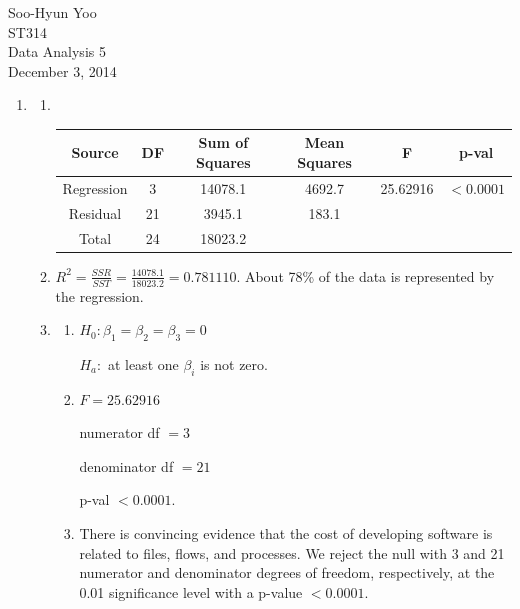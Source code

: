 \documentclass[12pt,letterpaper]{article}
\begin{document}
Soo-Hyun Yoo \\
ST314 \\
Data Analysis 5 \\
December 3, 2014

\begin{enumerate}
  \item
    \begin{enumerate}
      \item \hfill\\
        \begin{table}[!h]
          \centering
          \begin{tabular}{|c|c|c|c|c|c|} \hline
            Source & DF & Sum of Squares & Mean Squares & F & p-val \\ \hline\hline
            Regression & 3 & 14078.1 & 4692.7 & 25.62916 & $<0.0001$ \\ \hline
            Residual & 21 & 3945.1 & 183.1 & & \\ \hline
            Total & 24 & 18023.2 & & & \\ \hline
          \end{tabular}
        \end{table}
      \item $R^2 = \frac{SSR}{SST} = \frac{14078.1}{18023.2} = \boxed{0.781110}$. About 78\% of the data is represented by the regression.
      \item
        \begin{enumerate}
          \item $H_0: \beta_1 = \beta_2 = \beta_3 = 0$

            $H_a:$ at least one $\beta_i$ is not zero.
          \item $F = 25.62916$

            numerator df $= 3$

            denominator df $= 21$

            p-val $< 0.0001$.
          \item There is convincing evidence that the cost of developing
            software is related to files, flows, and processes. We reject the
            null with 3 and 21 numerator and denominator degrees of freedom,
            respectively, at the 0.01 significance level with a p-value $< 0.0001$.
        \end{enumerate}
    \end{enumerate}


\end{enumerate}
\end{document}
